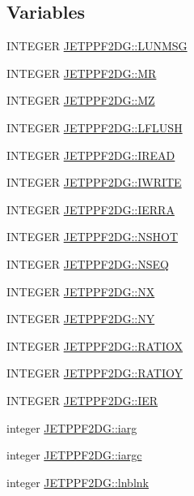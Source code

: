 \subsection*{Variables}
\begin{CompactItemize}
\item 
INTEGER \hyperlink{namespaceJETPPF2DG_258acbfd9dfc5ca34869c6edfdd89c8d}{JETPPF2DG::LUNMSG}
\item 
INTEGER \hyperlink{namespaceJETPPF2DG_5e02219aa819d9f9f40ffb1884684f2c}{JETPPF2DG::MR}
\item 
INTEGER \hyperlink{namespaceJETPPF2DG_887113770833f9aa581604f9474cb44c}{JETPPF2DG::MZ}
\item 
INTEGER \hyperlink{namespaceJETPPF2DG_6db6d04641a552fe57c7f140cb8c09e6}{JETPPF2DG::LFLUSH}
\item 
INTEGER \hyperlink{namespaceJETPPF2DG_5493047f501721b44b5e923dc3cd64d0}{JETPPF2DG::IREAD}
\item 
INTEGER \hyperlink{namespaceJETPPF2DG_ab53f9bbac5ae7882b6288685910c67f}{JETPPF2DG::IWRITE}
\item 
INTEGER \hyperlink{namespaceJETPPF2DG_47bfacdba737dd1c1fb6e676e5d5ace9}{JETPPF2DG::IERRA}
\item 
INTEGER \hyperlink{namespaceJETPPF2DG_e270735b1159e8e19c3b3c52b0bb3d51}{JETPPF2DG::NSHOT}
\item 
INTEGER \hyperlink{namespaceJETPPF2DG_1e11ff274dde21dbe30d2bb886dfd5b9}{JETPPF2DG::NSEQ}
\item 
INTEGER \hyperlink{namespaceJETPPF2DG_a57c322f474d9c8344c098ffb1f2fbbc}{JETPPF2DG::NX}
\item 
INTEGER \hyperlink{namespaceJETPPF2DG_fe7c59a5845e1d14c352d47c802827bb}{JETPPF2DG::NY}
\item 
INTEGER \hyperlink{namespaceJETPPF2DG_7115e44048e1de47d26e48726e317603}{JETPPF2DG::RATIOX}
\item 
INTEGER \hyperlink{namespaceJETPPF2DG_c27cb250b47cf21b49de19ad55baff1b}{JETPPF2DG::RATIOY}
\item 
INTEGER \hyperlink{namespaceJETPPF2DG_bc3d3903b29c339401d382d43fd4ecc5}{JETPPF2DG::IER}
\item 
integer \hyperlink{namespaceJETPPF2DG_ffda3e553d7afe1dc1f1b0b919addad8}{JETPPF2DG::iarg}
\item 
integer \hyperlink{namespaceJETPPF2DG_d26188761e21fc3625e8c5ed7d44695c}{JETPPF2DG::iargc}
\item 
integer \hyperlink{namespaceJETPPF2DG_407321de285e0bcd8e697236b9c7a990}{JETPPF2DG::lnblnk}
\item 

\end{CompactItemize}
